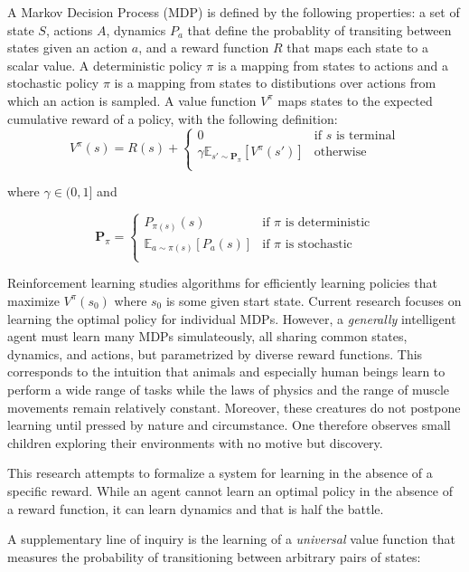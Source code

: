\documentclass{article}
\begin{document}
A Markov Decision Process (MDP) is defined by the following properties: a set of state $S$, actions $A$, dynamics $P_a$ that define the probablity of transiting between states given an action $a$, and a reward function $R$ that maps each state to a scalar value. A deterministic policy $\pi$ is a mapping from states to actions and a stochastic policy $\pi$ is a mapping from states to distibutions over actions from which an action is sampled. A value function $V^\pi$ maps states to the expected cumulative reward of a policy, with the following definition:
\[
  V^\pi(s) = R(s) +
  \begin{cases}
    0 & \text{if $s$ is terminal}\\ 
    \gamma \mathbb{E}_{s' \sim \bm{P}_\pi} \left[ V^\pi(s') \right] & \text{otherwise} \\ 
  \end{cases}
\]

where $\gamma \in (0, 1]$ and %

\[
  \bm{P}_\pi = 
  \begin{cases}
    P_{\pi(s)}(s) & \text{if $\pi$ is deterministic} \\
    \mathbb{E}_{a \sim \pi(s)}\left[ P_a(s) \right] & \text{if $\pi$ is stochastic} \\
  \end{cases}
\]

Reinforcement learning studies algorithms for efficiently learning policies that maximize $V^\pi(s_0)$ where $s_0$ is some given start state. Current research focuses on learning the optimal policy for individual MDPs. However, a \textit{generally} intelligent agent must learn many MDPs simulateously, all sharing common states, dynamics, and actions, but parametrized by diverse reward functions. This corresponds to the intuition that animals and especially human beings learn to perform a wide range of tasks while the laws of physics and the range of muscle movements remain relatively constant. Moreover, these creatures do not postpone learning until pressed by nature and circumstance. One therefore observes small children exploring their environments with no motive but discovery.

This research attempts to formalize a system for learning in the absence of a specific reward. While an agent cannot learn an optimal policy in the absence of a reward function, it can learn dynamics and that is half the battle. 

A supplementary line of inquiry is the learning of a \textit{universal} value function that measures the probability of transitioning between arbitrary pairs of states:
\end{document}
